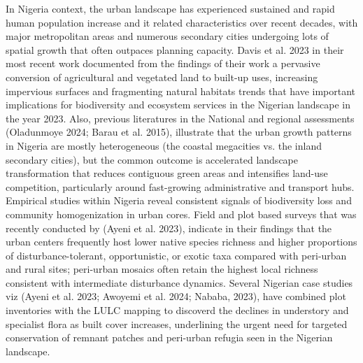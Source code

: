 In Nigeria context, the urban landscape has experienced sustained and rapid human population increase and it related characteristics over recent decades, with major metropolitan areas and numerous secondary cities undergoing lots of spatial growth that often outpaces planning capacity. Davis et al. 2023 in their most recent work documented from the findings of their work a pervasive conversion of agricultural and vegetated land to built-up uses, increasing impervious surfaces and fragmenting natural habitats trends that have important implications for biodiversity and ecosystem services in the Nigerian landscape in the year 2023. Also, previous literatures in the National and regional assessments (Oladunmoye 2024; Barau et al. 2015), illustrate that the urban growth patterns in Nigeria are mostly heterogeneous (the coastal megacities vs. the inland secondary cities), but the common outcome is accelerated landscape transformation that reduces contiguous green areas and intensifies land-use competition, particularly around fast-growing administrative and transport hubs.
Empirical studies within Nigeria reveal consistent signals of biodiversity loss and community homogenization in urban cores. Field and plot based surveys that was recently conducted by (Ayeni et al. 2023), indicate in their findings that the urban centers frequently host lower native species richness and higher proportions of disturbance-tolerant, opportunistic, or exotic taxa compared with peri-urban and rural sites; peri-urban mosaics often retain the highest local richness consistent with intermediate disturbance dynamics. Several Nigerian case studies viz (Ayeni et al. 2023; Awoyemi et al. 2024; Nababa, 2023), have combined plot inventories with the LULC mapping to discoverd the declines in understory and specialist flora as built cover increases, underlining the urgent need for targeted conservation of remnant patches and peri-urban refugia seen in the Nigerian landscape.
